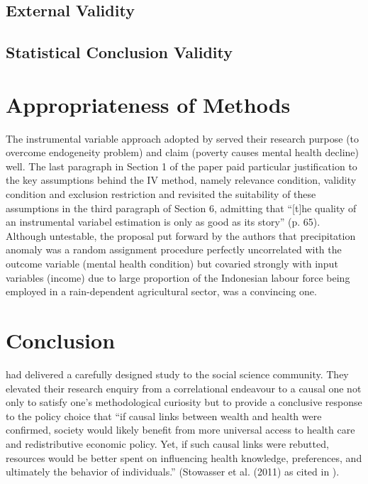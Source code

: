 \subsection{External Validity}

\subsection{Statistical Conclusion Validity}

\section{Appropriateness of Methods}

The instrumental variable approach adopted by \textcite{hanandita:2014} served their research purpose (to overcome endogeneity problem) and claim (poverty causes mental health decline) well. The last paragraph in Section 1 of the paper paid particular justification to the key assumptions behind the IV method, namely relevance condition, validity condition and exclusion restriction and revisited the suitability of these assumptions in the third paragraph of Section 6, admitting that ``[t]he quality of an instrumental variabel estimation is only as good as its story'' (p. 65). Although untestable, the proposal put forward by the authors that precipitation anomaly was a random assignment procedure perfectly uncorrelated with the outcome variable (mental health condition) but covaried strongly with input variables (income) due to large proportion of the Indonesian labour force being employed in a rain-dependent agricultural sector, was a convincing one.

\section{Conclusion}

\textcite{hanandita:2014} had delivered a carefully designed study to the social science community. They elevated their research enquiry from a correlational endeavour to a causal one not only to satisfy one's methodological curiosity but to provide a conclusive response to the policy choice that ``if causal links between wealth and health were confirmed, society would likely benefit from more universal access to health care and redistributive economic policy. Yet, if such causal links were rebutted, resources would be better spent on influencing health knowledge, preferences, and ultimately the behavior of individuals.'' (Stowasser et al. (2011) as cited in \textcite{hanandita:2014}).